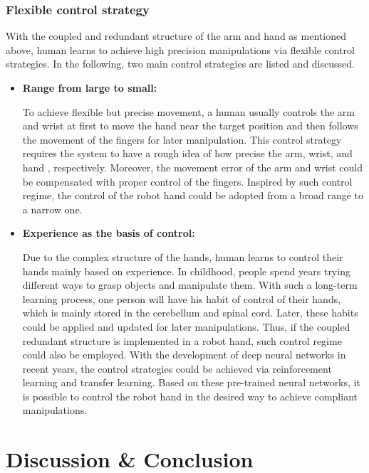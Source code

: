 \documentclass[journal,twoside,web]{ieeecolor}
\providecommand{\DIFadd}[1]{{\protect\color{blue}\uwave{#1}}} %
\providecommand{\DIFaddbegin}{} %
\providecommand{\DIFaddend}{} %
\newcommand{\DIFaddincludegraphics}[2][]{{\color{blue}\fbox{\DIFOincludegraphics[#1]{#2}}}} %
\DeclareRobustCommand{\DIFaddbegin}{\DIFOaddbegin \let\includegraphics\DIFaddincludegraphics} %
\DeclareRobustCommand{\DIFaddend}{\DIFOaddend \let\includegraphics\DIFOincludegraphics} %
\begin{document}
\subsubsection{Flexible control strategy} 
With the coupled and redundant structure of the arm and hand as mentioned above, \DIFaddbegin \DIFadd{a }\DIFaddend human learns to achieve high precision manipulations via flexible control strategies. In the following, two main control strategies are listed and discussed.
\begin{itemize}
    \item \textbf{Range from large to small:}

    To achieve flexible but precise movement, a human usually controls the arm and wrist at first to move the hand near the target position and then follows the movement of the fingers for later manipulation. This control strategy requires the system to have a rough idea of how precise the arm, wrist, and hand \DIFaddbegin \DIFadd{are}\DIFaddend , respectively. Moreover, the movement error of the arm and wrist could be compensated with proper control of the fingers. Inspired by such \DIFaddbegin \DIFadd{a }\DIFaddend control regime, the control of the robot hand could be adopted from a broad range to a narrow one.

    \item \textbf{Experience as the basis of control:}

    Due to the complex structure of the hands, human learns to control their hands mainly based on experience. In childhood, people spend years trying different ways to grasp objects and manipulate them. With such a long-term learning process, one person will have his habit of control of their hands, which is mainly stored in the cerebellum and spinal cord. Later, these habits could be applied and updated for later manipulations. Thus, if the coupled redundant structure is implemented in a robot hand, such control regime could also be employed. With the development of deep neural networks in recent years, the control strategies could be achieved via reinforcement learning and transfer learning. Based on these pre-trained neural networks, it is possible to control the robot hand in the desired way to achieve compliant manipulations.	
\end{itemize}

\section{Discussion \& Conclusion}
\label{sec:discuss}
\end{document}
